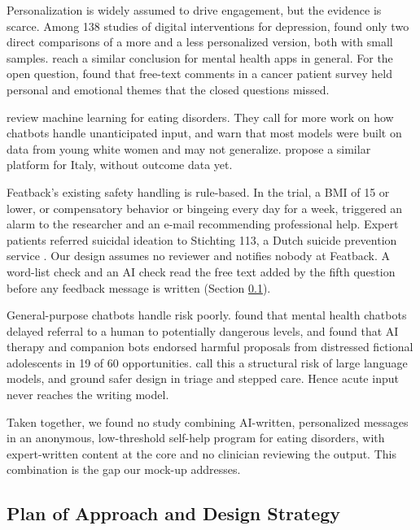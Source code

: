 \documentclass[a4paper]{article}
\begin{document}
Personalization is widely assumed to drive engagement, but the evidence is scarce. Among 138 studies of digital interventions for depression, \citet{hornstein2023personalization} found only two direct comparisons of a more and a less personalized version, both with small samples. \citet{matthews2025personalisation} reach a similar conclusion for mental health apps in general. For the open question, \citet{arditi2020computer} found that free-text comments in a cancer patient survey held personal and emotional themes that the closed questions missed.

\citet{fardouly2022ml} review machine learning for eating disorders. They call for more work on how chatbots handle unanticipated input, and warn that most models were built on data from young white women and may not generalize. \citet{monaco2024advanced} propose a similar platform for Italy, without outcome data yet.

Featback's existing safety handling is rule-based. In the trial, a BMI of 15 or lower, or compensatory behavior or bingeing every day for a week, triggered an alarm to the researcher and an e-mail recommending professional help. Expert patients referred suicidal ideation to Stichting 113, a Dutch suicide prevention service \citep{rohrbach2019protocol}. Our design assumes no reviewer and notifies nobody at Featback. A word-list check and an AI check read the free text added by the fifth question before any feedback message is written (Section \ref{subsection 2.3}).

General-purpose chatbots handle risk poorly. \citet{heston2023safety} found that mental health chatbots delayed referral to a human to potentially dangerous levels, and \citet{clark2025ability} found that AI therapy and companion bots endorsed harmful proposals from distressed fictional adolescents in 19 of 60 opportunities. \citet{lawrence2024opportunities} call this a structural risk of large language models, and \citet{BOLPAGNI2026101043} ground safer design in triage and stepped care. Hence acute input never reaches the writing model.

Taken together, we found no study combining AI-written, personalized messages in an anonymous, low-threshold self-help program for eating disorders, with expert-written content at the core and no clinician reviewing the output. This combination is the gap our mock-up addresses.

\subsection{Plan of Approach and Design Strategy} \label{subsection 2.3}
\end{document}
